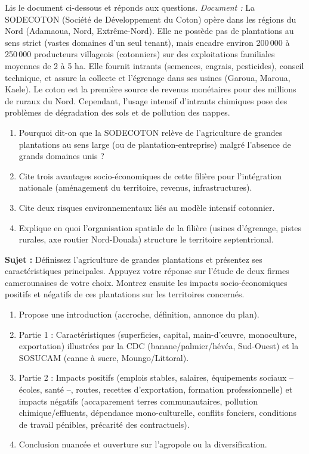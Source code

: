 \documentclass[11pt]{article}
\newcounter{popsec}
\newcounter{popsub}
\newcommand{\courssub}[1]{%
  \stepcounter{popsub}%
  \par\vspace{9pt}\noindent{\popxbold\fontsize{11.5}{13}\selectfont\color{popink}{\color{poporange}\thepopsec.\thepopsub}\hspace{6pt}#1}\par\nopagebreak\vspace{4pt}
}
\begin{document}
\begin{exercice}
Lis le document ci-dessous et réponds aux questions.
\textit{Document :} La SODECOTON (Société de Développement du Coton) opère dans les régions du Nord (Adamaoua, Nord, Extrême-Nord). Elle ne possède pas de \og plantations \fg{} au sens strict (vastes domaines d'un seul tenant), mais encadre environ 200\,000 à 250\,000 producteurs villageois (cotonniers) sur des exploitations familiales moyennes de 2 à 5 ha. Elle fournit intrants (semences, engrais, pesticides), conseil technique, et assure la collecte et l'égrenage dans ses usines (Garoua, Maroua, Kaele). Le coton est la première source de revenus monétaires pour des millions de ruraux du Nord. Cependant, l'usage intensif d'intrants chimiques pose des problèmes de dégradation des sols et de pollution des nappes.
\begin{enumerate}
\item Pourquoi dit-on que la SODECOTON relève de l'agriculture de \og grandes plantations \fg{} au sens large (ou de plantation-entreprise) malgré l'absence de grands domaines unis ?
\item Cite trois avantages socio-économiques de cette filière pour l'intégration nationale (aménagement du territoire, revenus, infrastructures).
\item Cite deux risques environnementaux liés au modèle intensif cotonnier.
\item Explique en quoi l'organisation spatiale de la filière (usines d'égrenage, pistes rurales, axe routier Nord-Douala) structure le territoire septentrional.
\end{enumerate}
\end{exercice}

\courssub{Je me prépare au Bac}

\begin{exercice}
\textbf{Sujet :} \og Définissez l'agriculture de grandes plantations et présentez ses caractéristiques principales. Appuyez votre réponse sur l'étude de deux firmes camerounaises de votre choix. Montrez ensuite les impacts socio-économiques positifs et négatifs de ces plantations sur les territoires concernés. \fg
\begin{enumerate}
\item Propose une introduction (accroche, définition, annonce du plan).
\item Partie 1 : Caractéristiques (superficies, capital, main-d'œuvre, monoculture, exportation) illustrées par la CDC (banane/palmier/hévéa, Sud-Ouest) et la SOSUCAM (canne à sucre, Moungo/Littoral).
\item Partie 2 : Impacts positifs (emplois stables, salaires, équipements sociaux -- écoles, santé --, routes, recettes d'exportation, formation professionnelle) et impacts négatifs (accaparement terres communautaires, pollution chimique/effluents, dépendance mono-culturelle, conflits fonciers, conditions de travail pénibles, précarité des contractuels).
\item Conclusion nuancée et ouverture sur l'agropole ou la diversification.
\end{enumerate}
\end{exercice}
\end{document}
